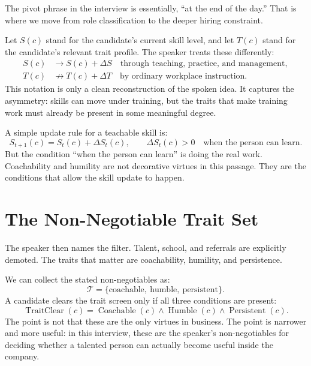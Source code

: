 The pivot phrase in the interview is essentially, ``at the end of the day.'' That is where we move from role classification to the deeper hiring constraint.

Let \(S(c)\) stand for the candidate's current skill level, and let \(T(c)\) stand for the candidate's relevant trait profile. The speaker treats these differently:
\begin{align}
  S(c) &\longrightarrow S(c) + \Delta S
  \quad\text{through teaching, practice, and management},\\
  T(c) &\not\longrightarrow T(c) + \Delta T
  \quad\text{by ordinary workplace instruction}.
\end{align}
This notation is only a clean reconstruction of the spoken idea. It captures the asymmetry: skills can move under training, but the traits that make training work must already be present in some meaningful degree.

A simple update rule for a teachable skill is:
\begin{equation}
  S_{t+1}(c)=S_t(c)+\Delta S_t(c),
  \qquad \Delta S_t(c)>0
  \quad\text{when the person can learn}.
\end{equation}
But the condition ``when the person can learn'' is doing the real work. Coachability and humility are not decorative virtues in this passage. They are the conditions that allow the skill update to happen.

\section{The Non-Negotiable Trait Set}

The speaker then names the filter. Talent, school, and referrals are explicitly demoted. The traits that matter are coachability, humility, and persistence.

We can collect the stated non-negotiables as:
\begin{equation}
  \mathcal{T}
  =
  \{\text{coachable},\ \text{humble},\ \text{persistent}\}.
\end{equation}
A candidate clears the trait screen only if all three conditions are present:
\begin{equation}
  \operatorname{TraitClear}(c)
  =
  \operatorname{Coachable}(c)
  \land
  \operatorname{Humble}(c)
  \land
  \operatorname{Persistent}(c).
\end{equation}
The point is not that these are the only virtues in business. The point is narrower and more useful: in this interview, these are the speaker's non-negotiables for deciding whether a talented person can actually become useful inside the company.

